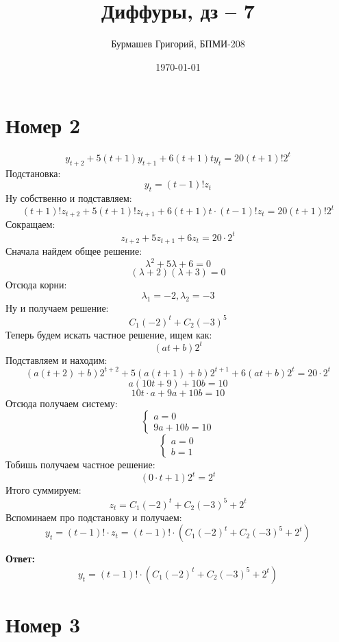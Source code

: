 \documentclass[a4paper,12pt]{article}
\author{Бурмашев Григорий, БПМИ-208}
\title{Диффуры, дз -- 7}
\date{\today}
\begin{document}
\maketitle
\section*{Номер 2}
\[ 
y_{t + 2} + 5(t + 1)y_{t + 1} + 6(t + 1)ty_t = 20(t + 1)!2^t
\]
Подстановка:
\[
y_t = (t-1)!z_t 
\]
Ну собственно и подставляем:
\[
(t+1)!z_{t + 2}+ 5(t + 1)!z_{t+1} + 6(t + 1)t \cdot (t-1)!z_t  = 20(t + 1)!2^t
\]
Сокращаем:
\[
z_{t+2} + 5z_{t + 1} + 6 z_t = 20 \cdot 2^t
\]
Сначала найдем общее решение:
\[
\lambda^2 + 5\lambda + 6 = 0
\]
\[
(\lambda+ 2)(\lambda  + 3) = 0
\]
Отсюда корни:
\[
\lambda_1 = -2, \lambda_2 = -3
\]
Ну и получаем решение:
\[
C_1 (-2)^t + C_2 (-3)^5 
\]
Теперь будем искать частное решение, ищем как:
\[
(at + b)2^t 
\]
Подставляем и находим:
\[
(a(t+2) +b)2^{t+2} + 5(a(t+1) + b)2^{t+1} + 6(at + b)2^t = 20 \cdot 2^t
\]
\[
a(10t + 9) + 10b = 10
\]
\[
10t \cdot a + 9a + 10b = 10
\]
Отсюда получаем систему:
\[
\begin{cases}
a = 0 \\
9a + 10b = 10
\end{cases}
\]
 \[
\begin{cases}
a = 0 \\
b = 1
\end{cases}
\]
Тобишь получаем частное решение:
\[
(0 \cdot t + 1)2^t = 2^t
\]
Итого суммируем:
\[
z_t = C_1 (-2)^t + C_2 (-3)^5  + 2^t 
\]
Вспоминаем про подстановку и получаем:
\[
y_t = (t-1)! \cdot z_t = (t-1)! \cdot (C_1 (-2)^t + C_2 (-3)^5  + 2^t ) 
\]
\begin{center}
\textbf{Ответ: } 
\[
y_t = (t-1)! \cdot (C_1 (-2)^t + C_2 (-3)^5  + 2^t ) 
\]
\end{center}
\clearpage
\section*{Номер 3}
\end{document}
